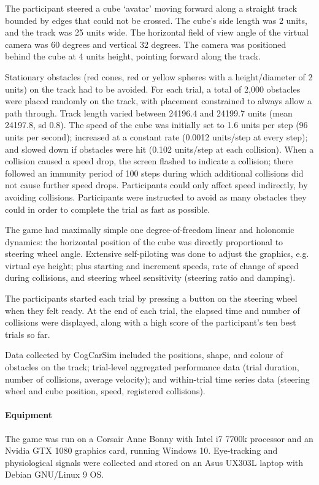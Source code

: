 \documentclass{frontierstyle/frontiersSCNS}
\begin{document}
The participant steered a cube `avatar' moving forward along a straight track bounded by edges that could not be crossed. The cube's side length was 2 units, and the track was 25 units wide.  The horizontal field of view angle of the virtual camera was 60 degrees and vertical 32 degrees. The camera was positioned behind the cube at 4 units height, pointing forward along the track.

Stationary obstacles (red cones, red or yellow spheres with a height/diameter of 2 units) on the track had to be avoided. For each trial, a total of 2,000 obstacles were placed randomly on the track, with placement constrained to always allow a path through. Track length varied between 24196.4 and 24199.7 units (mean 24197.8, sd 0.8). The speed of the cube was initially set to 1.6 units per step (96 units per second); increased at a constant rate (0.0012 units/step at every step); and slowed down if obstacles were hit (0.102 units/step at each collision). When a collision caused a speed drop, the screen flashed to indicate a collision; there followed an immunity period of 100 steps during which additional collisions did not cause further speed drops. Participants could only affect speed indirectly, by avoiding collisions.  Participants were instructed to avoid as many obstacles they could in order to complete the trial as fast as possible.

The game had maximally simple one degree-of-freedom linear and holonomic dynamics: the horizontal position of the cube was directly proportional to steering wheel angle. Extensive self-piloting was done to adjust the graphics, e.g. virtual eye height; plus starting and increment speeds, rate of change of speed during collisions, and steering wheel sensitivity (steering ratio and damping).

The participants started each trial by pressing a button on the steering wheel when they felt ready. At the end of each trial, the elapsed time and number of collisions were displayed, along with a high score of the participant's ten best trials so far.

Data collected by CogCarSim included the positions, shape, and colour of obstacles on the track; trial-level aggregated performance data (trial duration, number of collisions, average velocity); and within-trial time series data (steering wheel and cube position, speed, registered collisions).

\paragraph*{Equipment} The game was run on a Corsair Anne Bonny with Intel i7 7700k processor and an Nvidia GTX 1080 graphics card, running Windows 10. Eye-tracking and physiological signals were collected and stored on an Asus UX303L laptop with Debian GNU/Linux 9 OS.
\end{document}
